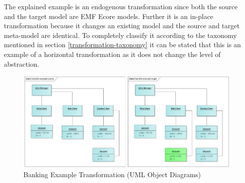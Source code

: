 \documentclass[runningheads]{llncs}
\begin{document}
The explained example \cite{henshin-banking-example} is an endogenous transformation since both the source and the target model are EMF Ecore models. Further it is an in-place transformation because it changes an existing model and the source and target meta-model are identical. To completely classify it according to the taxonomy mentioned in section \ref{transformation-taxonomy} it can be stated that this is an example of a horizontal transformation as it does not change the level of abstraction.

\begin{figure}[H]
	\centering
	\includegraphics[width=1.0\textwidth]{bank_example_transformation}
	\caption{Banking Example Transformation (UML Object Diagrams)}
	\label{fig:henshin-banking-example-transformation}
\end{figure}
\end{document}
